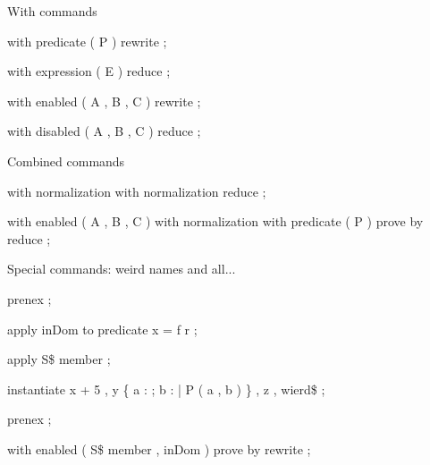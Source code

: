 With commands

\begin{zproof}[withCmds]

 with predicate ( P ) rewrite ;
 
 with expression ( E ) reduce ;
 
 with enabled ( A , B , C ) rewrite ;
 
 with disabled ( A , B , C ) reduce ;
 

\end{zproof}



Combined commands

\begin{zproof}[combinedCmd1]

 with normalization with normalization reduce ;
 
 with enabled ( A , B , C ) with normalization with predicate ( P ) prove by reduce ;
 

\end{zproof}




Special commands: weird names and all...

\begin{zproof}

 prenex ;
 
 apply inDom to predicate x = \dom f \cup \dom r ;
 
 apply S\$ member ;
 
 instantiate x  + 5 , y  \{ a : \nat ; b : \nat | P ( a , b ) \} , z  , wierd\$   ;
 
 prenex ;
 
 with enabled ( S\$ member , inDom ) prove by rewrite ;
 

\end{zproof}



